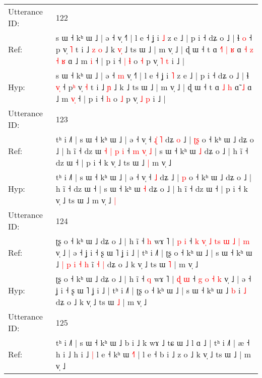 \documentclass[10pt]{article}
\DeclareRobustCommand{\hl}[1]{{\textcolor{red}{#1}}}
\begin{document}
\begin{longtable}{ll}
 \\
\midrule
Utterance ID: & 122 \\
Ref: & s ɯ ˧ kʰ ɯ ˩ | ə ˧\hl{}\hl{} v̩ ˧˥ | l e ˧ ʝ i \hl{˩} z e ˩ | p i ˧ dʑ o ˩ | ɬ \hl{}\hl{o} ˧ p\hl{} v̩ \hl{˥} t i ˩\hl{ }\hl{z} \hl{o} ˩ k\hl{ }\hl{v}\hl{̩} ˩ ts ɯ ˩ | m v̩ ˩ | ɖ ɯ ˧ t ɑ\hl{ }\hl{˧}\hl{˥} \hl{|} \hl{ʁ} ɑ\hl{ }\hl{˧}\hl{ }\hl{z}\hl{ }\hl{˧} \hl{ʁ} ɑ ˩ m \hl{}\hl{i} ˧ | p i ˧\hl{ }\hl{|} \hl{ɬ} o \hl{˧} p v̩ \hl{˥} \hl{t} i ˩ |
 \\
Hyp: & s ɯ ˧ kʰ ɯ ˩ | ə ˧\hl{ }\hl{m} v̩ ˧˥ | l e ˧ ʝ i \hl{˥} z e ˩ | p i ˧ dʑ o ˩ | ɬ \hl{v}\hl{̩} ˧ p\hl{ʰ} v̩ \hl{˧} t i ˩\hl{}\hl{} \hl{ɲ} ˩ k\hl{}\hl{}\hl{} ˩ ts ɯ ˩ | m v̩ ˩ | ɖ ɯ ˧ t ɑ\hl{}\hl{}\hl{} \hl{˩} \hl{h} ɑ\hl{}\hl{}\hl{}\hl{}\hl{}\hl{̃} \hl{˩} ɑ ˩ m \hl{v}\hl{̩} ˧ | p i ˧\hl{}\hl{} \hl{h} o \hl{˩} p v̩ \hl{˩} \hl{p} i ˩ |
 \\
\midrule
Utterance ID: & 123 \\
Ref: & tʰ i ˩˥ | s ɯ ˧ kʰ ɯ ˩ | ə ˧ v̩ ˧\hl{ }\hl{ɻ}\hl{̍} \hl{˥} dʑ\hl{ }\hl{o} ˩ | \hl{ʈ}\hl{ʂ} o ˧ kʰ ɯ ˩ dʑ o ˩ | h ĩ ˧ dz ɯ\hl{ }\hl{˧}\hl{ }\hl{|}\hl{ }\hl{p}\hl{ }\hl{i} ˧\hl{ }\hl{m}\hl{ }\hl{v}\hl{̩}\hl{ }\hl{˩} | s ɯ ˧ kʰ ɯ \hl{˩} dʑ o ˩ | h ĩ ˧ dz ɯ ˧ | p i ˧ k v̩ ˩ ts ɯ ˩\hl{ }\hl{|} m v̩ ˩\hl{}\hl{}
 \\
Hyp: & tʰ i ˩˥ | s ɯ ˧ kʰ ɯ ˩ | ə ˧ v̩ ˧\hl{}\hl{}\hl{} \hl{˩} dʑ\hl{}\hl{} ˩ | \hl{}\hl{p} o ˧ kʰ ɯ ˩ dʑ o ˩ | h ĩ ˧ dz ɯ\hl{}\hl{}\hl{}\hl{}\hl{}\hl{}\hl{}\hl{} ˧\hl{}\hl{}\hl{}\hl{}\hl{}\hl{}\hl{} | s ɯ ˧ kʰ ɯ \hl{˧} dʑ o ˩ | h ĩ ˧ dz ɯ ˧ | p i ˧ k v̩ ˩ ts ɯ ˩\hl{}\hl{} m v̩ ˩\hl{ }\hl{|}
 \\
\midrule
Utterance ID: & 124 \\
Ref: & ʈʂ o ˧ kʰ ɯ ˩ dʑ o ˩ | h ĩ ˧ \hl{h} wɤ ˥ | \hl{p} \hl{i} ˧\hl{ }\hl{k}\hl{ }\hl{v}\hl{̩}\hl{ }\hl{˩}\hl{ }\hl{t}\hl{s} \hl{ɯ} \hl{˩} \hl{|} \hl{m} v̩ ˩ | ə ˧ ʝ i ˧ ʂ ɯ ˥ ʝ i ˩ | tʰ i ˩˥ | ʈʂ o ˧ kʰ ɯ ˩ | s ɯ ˧ kʰ ɯ ˩\hl{ }\hl{|}\hl{ }\hl{p}\hl{ }\hl{i}\hl{ }\hl{˧} \hl{h} i\hl{̃}\hl{ }\hl{˧} \hl{|} dʑ o ˩ k v̩ ˩ ts ɯ \hl{˥} | m v̩ ˩
 \\
Hyp: & ʈʂ o ˧ kʰ ɯ ˩ dʑ o ˩ | h ĩ ˧ \hl{q} wɤ ˥ | \hl{ɖ} \hl{ɯ} ˧\hl{}\hl{}\hl{}\hl{}\hl{}\hl{}\hl{}\hl{}\hl{}\hl{} \hl{g} \hl{o} \hl{˧} \hl{k} v̩ ˩ | ə ˧ ʝ i ˧ ʂ ɯ ˥ ʝ i ˩ | tʰ i ˩˥ | ʈʂ o ˧ kʰ ɯ ˩ | s ɯ ˧ kʰ ɯ ˩\hl{}\hl{}\hl{}\hl{}\hl{}\hl{}\hl{}\hl{} \hl{b} i\hl{}\hl{}\hl{} \hl{˩} dʑ o ˩ k v̩ ˩ ts ɯ \hl{˩} | m v̩ ˩
 \\
\midrule
Utterance ID: & 125 \\
Ref: & tʰ i ˩˥ | s ɯ ˧ kʰ ɯ ˩ b i ˩ k wɤ ˩ tɕ ɯ ˩ l ɑ ˩ | tʰ i ˩˥ | æ ˧ h i ˩ h i ˩\hl{ }\hl{|} l e ˧ kʰ ɯ \hl{˧}\hl{˥} | l e ˧ b i ˩ z o ˩ k v̩ ˩ ts ɯ ˩ | m v̩ ˩\hl{}\hl{}

\end{longtable}
\end{document}
